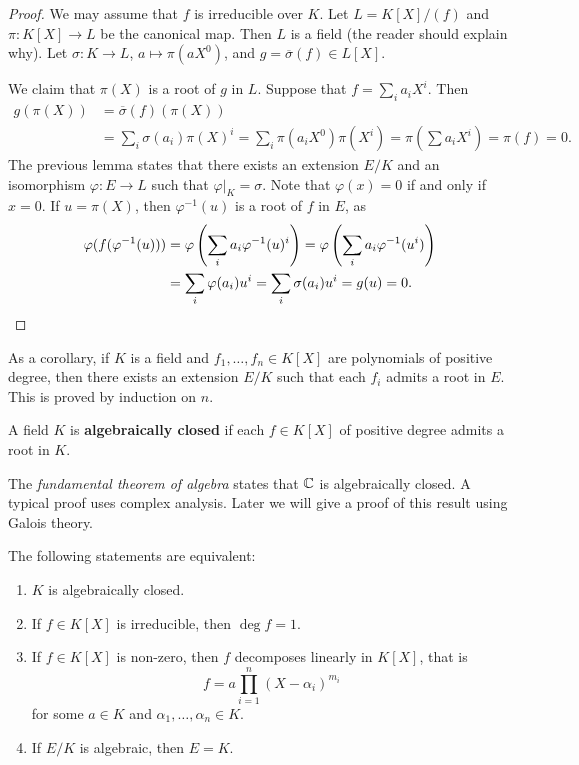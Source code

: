 \begin{proof}
	We may assume that $f$ is irreducible over $K$. Let $L=K[X]/(f)$ and 
	$\pi\colon K[X]\to L$ be the canonical map. Then $L$ 
	is a field (the reader should explain why). 
	Let $\sigma\colon K\to L$, $a\mapsto \pi(aX^0)$, and 
	$g=\overline{\sigma}(f)\in L[X]$. 

	We claim that $\pi(X)$ is a root of $g$ in $L$. Suppose that $f=\sum_i a_iX^i$. 
	Then 
	\begin{align*}
		g(\pi(X))&=\overline{\sigma}(f)(\pi(X))\\
		&=\sum_i \sigma(a_i)\pi(X)^i
		=\sum_i\pi(a_iX^0)\pi(X^i)=\pi(\sum a_iX^i)=\pi(f)=0.
	\end{align*}
	The previous lemma states that 
	there exists an extension $E/K$ and an isomorphism $\varphi\colon E\to L$
	such that $\varphi|_K=\sigma$. Note that
	$\varphi(x)=0$ if and only if $x=0$. If $u=\pi(X)$, then $\varphi^{-1}(u)$ is a root of $f$ in $E$, 
	as 
	\begin{align*}
		\varphi(f(\varphi^{-1}(u)))&=\varphi\left(\sum_ia_i\varphi^{-1}(u)^i\right)
		=\varphi\left(\sum_ia_i\varphi^{-1}(u^i)\right)\\
		&=\sum_i\varphi(a_i)u^i=\sum_i\sigma(a_i)u^i=g(u)=0.\qedhere
	\end{align*}
\end{proof}

As a corollary, if $K$ is a field and $f_1,\dots,f_n\in K[X]$ are polynomials 
of positive degree, then there exists an extension $E/K$  such that 
each $f_i$ admits a root in $E$. This is proved by induction on $n$.  

\begin{definition}
	A field $K$ is \textbf{algebraically closed} if each $f\in K[X]$ 
	of positive degree admits a root in $K$. 
\end{definition}

The \emph{fundamental theorem of algebra} states that $\mathbb{C}$ is algebraically closed. A
typical proof uses complex analysis.  Later we will give a proof of this result
using Galois theory. 

\begin{proposition}
	The following statements are equivalent:
	\begin{enumerate}
		\item $K$ is algebraically closed.
		\item If $f\in K[X]$ is irreducible, then $\deg f=1$.
		\item If $f\in K[X]$ is non-zero, then $f$ decomposes linearly in $K[X]$, that is
			\[
				f=a\prod_{i=1}^n(X-\alpha_i)^{m_i}
			\]
			for some $a\in K$ and $\alpha_1,\dots,\alpha_n\in K$. 
		\item If $E/K$ is algebraic, then $E=K$. 
	\end{enumerate}
\end{proposition}


